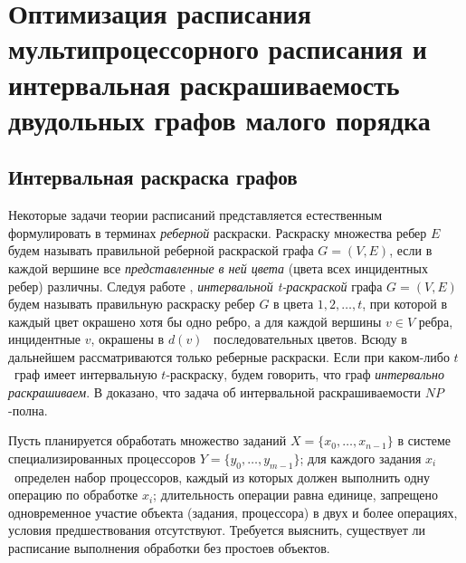 
\chapter{Оптимизация расписания мультипроцессорного расписания и интервальная раскрашиваемость двудольных графов малого порядка}\label{AKM_ch1}



\section{Интервальная раскраска графов}\label{AKM_ch1_1}


Некоторые задачи теории расписаний представляется естественным формулировать в терминах \textit{реберной} раскраски.
Раскраску множества ребер  $E$  будем называть правильной реберной раскраской графа  $G=(V,E)$, если в каждой вершине
все \textit{представленные} \textit{в ней цвета} (цвета всех инцидентных ребер) различны. Следуя работе \cite{AKM_ch1_bib4},
\textit{интервальной t-раскраской} графа  $G=(V,E)$  будем называть правильную раскраску ребер  $G$  в цвета
$1,2,\dots ,t$, при которой в каждый цвет окрашено хотя бы одно ребро, а для каждой вершины  $v\in V$  ребра,
инцидентные  $v$, окрашены в  $d(v)$ \ последовательных цветов. Всюду в дальнейшем рассматриваются только реберные
раскраски. Если при каком-либо  $t$ \ граф имеет интервальную  $t${}-раскраску, будем говорить, что граф
\textit{интервально раскрашиваем}. В \cite{AKM_ch1_bib4} доказано, что задача об интервальной раскрашиваемости  $\mathit{NP}${}-полна.

Пусть планируется обработать множество заданий  $X=\{x_0,\dots ,x_{n-1}\}$  в системе специализированных процессоров
$Y=\{y_0,\dots ,y_{m-1}\}$; для каждого задания  $x_i$ \ определен набор процессоров, каждый из которых должен
выполнить одну операцию по обработке  $x_i$; длительность операции равна единице, запрещено одновременное участие
объекта (задания, процессора) в двух и более операциях, условия предшествования отсутствуют. Требуется выяснить,
существует ли расписание выполнения обработки без простоев объектов.

